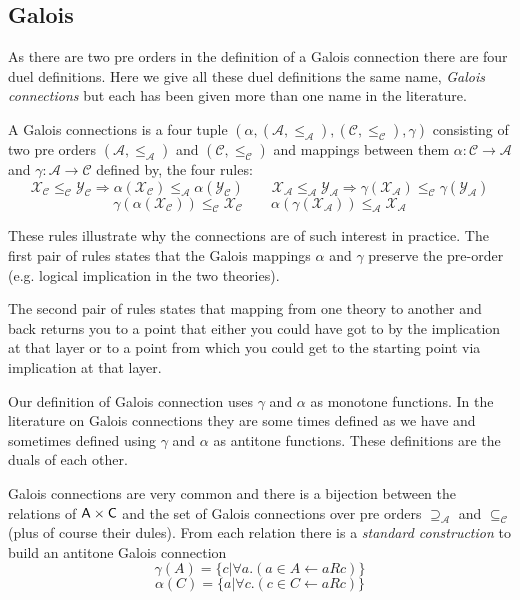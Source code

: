 \subsection{Galois}\label{sec:Gal}
 As there are two pre orders in the definition of a Galois connection there  are four duel definitions. Here we give all these duel definitions the same name, \emph{Galois connections} but each has  been given more than one name in the literature.

A Galois connections is a four tuple  $( \alpha, (\mathcal{A},\leq_\mathcal{A}), (\mathcal{C},  \leq_\mathcal{C}),\gamma)$ consisting of two  pre orders $(\mathcal{A},\leq_\mathcal{A})$ and  $(\mathcal{C},\leq_\mathcal{C})$
and mappings between them $\alpha : \mathcal{C} \rightarrow \mathcal{A}$ and  $\gamma : \mathcal{A} \rightarrow \mathcal{C}$
 defined by, the four rules:
 \[   \mathcal{ X_C  \leq_\mathcal{C}  Y_C \Rightarrow \alpha(X_C) \leq_\mathcal{A} \alpha(Y_C)  \qquad 
	 X_A  \leq_\mathcal{A}  Y_A \Rightarrow \gamma(X_A) \leq_\mathcal{C} \gamma(Y_A) } \]
\[ \mathcal{ \gamma(\alpha(X_C))  \leq_\mathcal{C}  X_C\qquad 
   \alpha(\gamma(X_A))   \leq_\mathcal{A}  X_A }  \]
     

These rules illustrate why the connections are of such interest in practice. 
The first pair of rules states that the Galois mappings $\alpha$ and $\gamma$ preserve  the pre-order (e.g. logical implication in the two theories).


The second pair of rules states that mapping from one theory to another and back returns you to a point that either you could have got to by the implication at that layer or to a point from which you could get to the starting point via implication at that layer.


Our definition of Galois connection uses $\gamma$ and $\alpha$ as monotone functions. In the literature on Galois connections they are some times defined as we have and sometimes defined using $\gamma$ and $\alpha$ as antitone functions. These definitions are the duals of each other.

Galois connections are very common and there is a bijection between the relations of ${\sf A \times C}$ and the set of Galois connections over pre orders $\supseteq_\mathcal{A}$ and  $\subseteq_\mathcal{C}$ (plus of course their dules). From each relation there is a \emph{standard construction} to build an antitone Galois connection 
\[\gamma(A) = \{c | \forall a. (a\in A \leftarrow aRc)\} \]
\[\alpha(C) = \{a | \forall c. (c\in C \leftarrow aRc)\} \]

